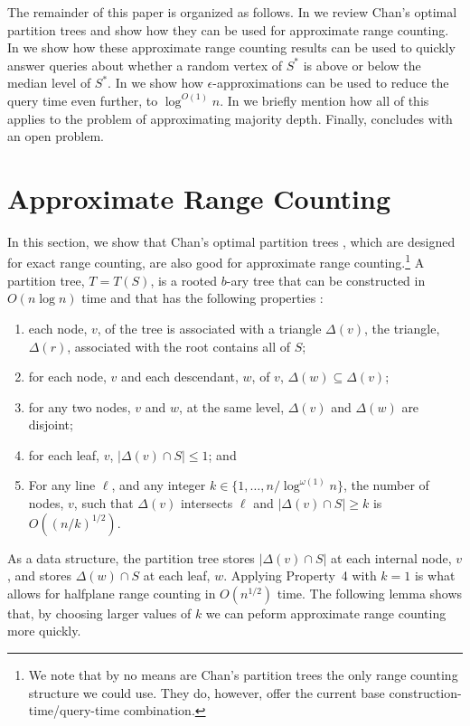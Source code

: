 \documentclass{cccg12}
\begin{document}
The remainder of this paper is organized as follows.  In
 we review Chan's optimal partition trees
and show how they can be used for approximate range counting.
In  we show how these approximate range
counting results can be used to quickly answer queries about whether
a random vertex of $S^*$ is above or below the median level of $S^*$.
In  we show how $\epsilon$-approximations can
be used to reduce the query time even further, to $\log^{O(1)} n$.
In  we briefly mention how all of this applies to
the problem of approximating majority depth.  Finally, 
concludes with an open problem.

\section{Approximate Range Counting}

In this section, we show that Chan's optimal partition trees \cite{c12},
which are designed for exact range counting, are also good for approximate
range counting.\footnote{We note that by no means are Chan's partition
trees the only range counting structure we could use.  They do, however,
offer the current base construction-time/query-time combination.}
A partition tree, $T=T(S)$, is a rooted $b$-ary tree that can be
constructed in $O(n\log n)$ time and that has the following properties
\cite[Theorems~3.2 and 4.2]{c12}:

\begin{enumerate}
  \item each node, $v$, of the tree is associated with a triangle
    $\Delta(v)$, the triangle, $\Delta(r)$, associated with the root
    contains all of $S$;
  \item for each node, $v$ and each descendant, $w$, of $v$,
    $\Delta(w)\subseteq\Delta(v)$;
  \item for any two nodes, $v$ and $w$, at the same level, $\Delta(v)$
    and $\Delta(w)$ are disjoint; 
  \item for each leaf, $v$, $|\Delta(v)\cap S| \le 1$; and 
  \item For any line $\ell$, and any integer
    $k\in\{1,\ldots,n/\log^{\omega(1)} n\}$, the number of nodes, $v$,
    such that $\Delta(v)$ intersects $\ell$ and $|\Delta(v)\cap S|\ge k$
    is $O((n/k)^{1/2})$.
\end{enumerate}

As a data structure, the partition tree stores $|\Delta(v)\cap S|$
at each internal node, $v$, and stores $\Delta(w)\cap S$ at each
leaf, $w$.  Applying Property~4 with $k=1$ is what allows for halfplane
range counting in $O(n^{1/2})$ time.  The following lemma shows that,
by choosing larger values of $k$ we can peform approximate range
counting more quickly.
\end{document}
